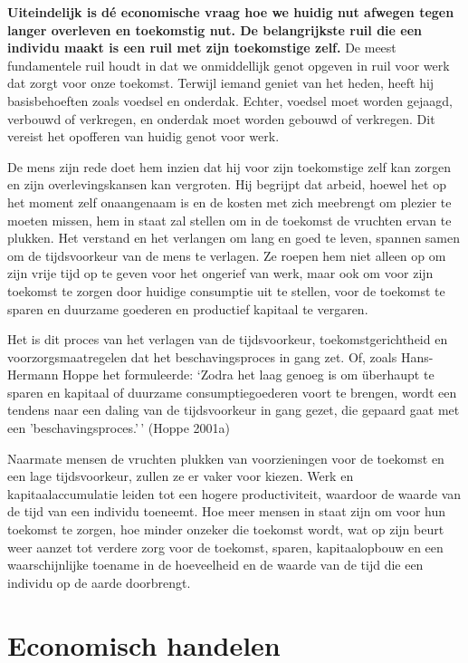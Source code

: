 \documentclass[
  a5paper,
  smalldemyvopaper,11pt,twoside,onecolumn,openright,extrafontsizes,
hidelinks]{memoir}
\begin{document}
\textbf{Uiteindelijk is dé economische vraag hoe we huidig nut afwegen
tegen langer overleven en toekomstig nut. De belangrijkste ruil die een
individu maakt is een ruil met zijn toekomstige zelf.} De meest
fundamentele ruil houdt in dat we onmiddellijk genot opgeven in ruil
voor werk dat zorgt voor onze toekomst. Terwijl iemand geniet van het
heden, heeft hij basisbehoeften zoals voedsel en onderdak. Echter,
voedsel moet worden gejaagd, verbouwd of verkregen, en onderdak moet
worden gebouwd of verkregen. Dit vereist het opofferen van huidig genot
voor werk.

De mens zijn rede doet hem inzien dat hij voor zijn toekomstige zelf kan
zorgen en zijn overlevingskansen kan vergroten. Hij begrijpt dat arbeid,
hoewel het op het moment zelf onaangenaam is en de kosten met zich
meebrengt om plezier te moeten missen, hem in staat zal stellen om in de
toekomst de vruchten ervan te plukken. Het verstand en het verlangen om
lang en goed te leven, spannen samen om de tijdsvoorkeur van de mens te
verlagen. Ze roepen hem niet alleen op om zijn vrije tijd op te geven
voor het ongerief van werk, maar ook om voor zijn toekomst te zorgen
door huidige consumptie uit te stellen, voor de toekomst te sparen en
duurzame goederen en productief kapitaal te vergaren.

Het is dit proces van het verlagen van de tijdsvoorkeur,
toekomstgerichtheid en voorzorgsmaatregelen dat het beschavingsproces in
gang zet. Of, zoals Hans-Hermann Hoppe het formuleerde: `Zodra het laag
genoeg is om überhaupt te sparen en kapitaal of duurzame
consumptiegoederen voort te brengen, wordt een tendens naar een daling
van de tijdsvoorkeur in gang gezet, die gepaard gaat met een
'beschavingsproces.'\,' (Hoppe 2001a)

Naarmate mensen de vruchten plukken van voorzieningen voor de toekomst
en een lage tijdsvoorkeur, zullen ze er vaker voor kiezen. Werk en
kapitaalaccumulatie leiden tot een hogere productiviteit, waardoor de
waarde van de tijd van een individu toeneemt. Hoe meer mensen in staat
zijn om voor hun toekomst te zorgen, hoe minder onzeker die toekomst
wordt, wat op zijn beurt weer aanzet tot verdere zorg voor de toekomst,
sparen, kapitaalopbouw en een waarschijnlijke toename in de hoeveelheid
en de waarde van de tijd die een individu op de aarde doorbrengt.

\section{Economisch handelen}\label{economisch-handelen}
\end{document}

